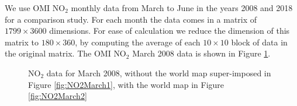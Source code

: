 \documentclass[11pt]{article}
\begin{document}
	We use OMI $\text{NO}_2$ monthly data from March to June in the years 2008 and 2018 for a comparison study. For each month the data comes in a matrix of $1799 \times 3600 $ dimensions. For ease of calculation we reduce the dimension of this matrix to $180 \times 360 $, by computing the average of each $10 \times 10$ block of data in the original matrix. The OMI $\text{NO}_2$ March 2008 data is shown in Figure \ref{fig:NO2March2008}. 

	\begin{figure}[H]
		\centering
		\caption{\footnotesize $\text{NO}_2$ data for March 2008, without the world map super-imposed in Figure \ref{fig:NO2March1}, with the world map in Figure \ref{fig:NO2March2} }
		\label{fig:NO2March2008}
	\end{figure}

	
\end{document}
